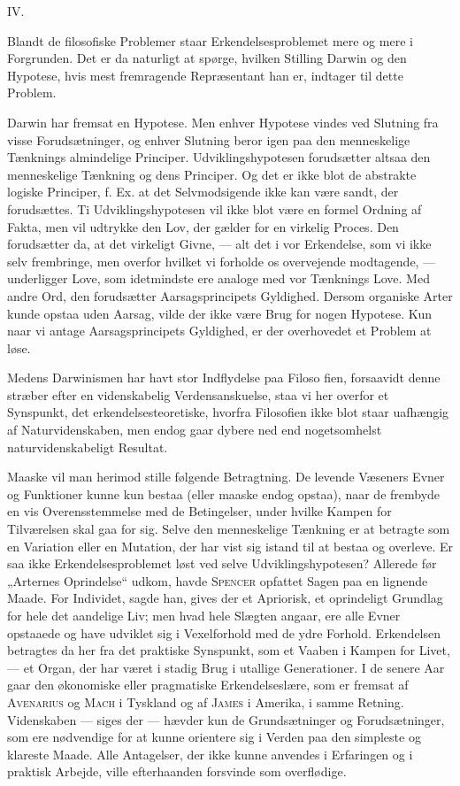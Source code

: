 \documentclass[12pt,a4paper,openany]{book}
\newcommand{\opage}[1]{\marginnote{\footnotesize\textit{[#1]}}}
\begin{document}
\begin{center}IV.\end{center}


Blandt de filosofiske Problemer staar Erkendelsesproblemet
mere og mere i Forgrunden. Det er da naturligt at spørge,
hvilken Stilling Darwin og den Hypotese, hvis mest fremragende
Repræsentant han er, indtager til dette Problem.

Darwin har fremsat en Hypotese. Men enhver Hypotese
vindes ved Slutning fra visse Forudsætninger, og enhver Slutning
beror igen paa den menneskelige Tænknings almindelige
Principer. Udviklingshypotesen forudsætter altsaa den menneskelige
Tænkning og dens Principer. Og det er ikke blot de
abstrakte logiske Principer, f. Ex. at det Selvmodsigende ikke
kan være sandt, der forudsættes. Ti Udviklingshypotesen vil
ikke blot være en formel Ordning af Fakta, men vil udtrykke
den Lov, der gælder for en virkelig Proces. Den forudsætter
da, at det virkeligt Givne, --- alt det i vor Erkendelse, som
vi ikke selv frembringe, men overfor hvilket vi forholde os
overvejende modtagende, --- underligger Love, som idetmindste
ere analoge med vor Tænknings Love. Med andre Ord, den
forudsætter Aarsagsprincipets Gyldighed. Dersom organiske Arter
kunde opstaa uden Aarsag, vilde der ikke være Brug for
nogen Hypotese. Kun naar vi antage Aarsagsprincipets Gyldighed,
er der overhovedet et Problem at løse.

Medens Darwinismen har havt stor Indflydelse paa Filoso%
\setcounter{footnote}{0}%
\opage{216}fien, forsaavidt denne stræber efter en videnskabelig Verdensanskuelse,
staa vi her overfor et Synspunkt, det erkendelsesteoretiske,
hvorfra Filosofien ikke blot staar uafhængig af Naturvidenskaben,
men endog gaar dybere ned end nogetsomhelst
naturvidenskabeligt Resultat.

Maaske vil man herimod stille følgende Betragtning. De
levende Væseners Evner og Funktioner kunne kun bestaa (eller
maaske endog opstaa), naar de frembyde en vis Overensstemmelse
med de Betingelser, under hvilke Kampen for Tilværelsen
skal gaa for sig. Selve den menneskelige Tænkning er at
betragte som en Variation eller en Mutation, der har vist sig
istand til at bestaa og overleve. Er saa ikke Erkendelsesproblemet
løst ved selve Udviklingshypotesen? Allerede før „Arternes
Oprindelse“ udkom, havde \textsc{Spencer} opfattet Sagen paa
en lignende Maade. For Individet, sagde han, gives der et
Apriorisk, et oprindeligt Grundlag for hele det aandelige Liv;
men hvad hele Slægten angaar, ere alle Evner opstaaede og
have udviklet sig i Vexelforhold med de ydre Forhold. Erkendelsen
betragtes da her fra det praktiske Synspunkt, som et
Vaaben i Kampen for Livet, --- et Organ, der har været i
stadig Brug i utallige Generationer. I de senere Aar gaar den
økonomiske eller pragmatiske Erkendelseslære, som er fremsat
af \textsc{Avenarius} og \textsc{Mach} i Tyskland og af \textsc{James} i Amerika, i
samme Retning. Videnskaben --- siges der --- hævder kun de
Grundsætninger og Forudsætninger, som ere nødvendige for at
kunne orientere sig i Verden paa den simpleste og klareste
Maade. Alle Antagelser, der ikke kunne anvendes i Erfaringen
og i praktisk Arbejde, ville efterhaanden forsvinde som overflødige.
\end{document}
